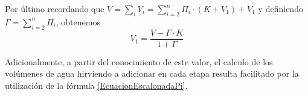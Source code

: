 \begin{itemize}
                \par Por último recordando que $V = \sum_i V_i = \sum_{i=2}^{n} \Pi_i \cdot(K + V_1) + V_1$ y definiendo $\Gamma = \sum_{i=2}^n \Pi_i$, obtenemos
                \begin{equation}
                    V_1 = \frac{V - \Gamma \cdot K}{1 + \Gamma}
                \end{equation}
                
                \par Adicionalmente, a partir del conocimiento de este valor, el calculo de los volúmenes de agua hirviendo a adicionar en cada etapa resulta facilitado por la utilización de la fórmula \ref{EcuacionEscalonadaPi}.
            \end{itemize} %